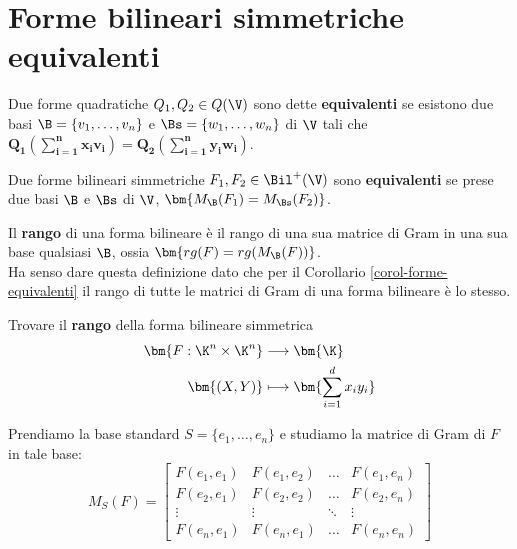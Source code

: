 \documentclass[11pt, a4paper, titlepage, oneside]{scrbook}
\begin{document}
\section{Forme bilineari simmetriche equivalenti}

\begin{Definizione}
\label{def-forme-quadratiche-equivalenti}
Due forme quadratiche $Q_1, Q_2 \in Q(\V)$ sono dette \textbf{equivalenti} se esistono due basi $\B = \{v_1, \ldots, v_n\}$ e $\Bs = \{w_1, \ldots, w_n\}$ di $\V$ tali che \mbox{$\bm{Q_1(\sum_{i = 1}^n x_i v_i) = Q_2(\sum_{i = 1}^n y_i w_i)}$}. 
\end{Definizione}

\begin{Definizione}
\label{def-forme-bilineari-simmmetriche-equivalenti}
Due forme bilineari simmetriche $F_1, F_2 \in \Bil^+(\V)$ sono \textbf{equivalenti} se prese due basi $\B$ e $\Bs$ di $\V$, \mbox{$\bm{M_\B(F_1) = M_\Bs(F_2)}$}.
\end{Definizione}

\begin{Definizione}
\label{def-rango-forma-bilienare}
Il \textbf{rango} di una forma bilineare è il rango di una sua matrice di Gram in una sua base qualsiasi $\B$, ossia $\bm{rg(F) = rg(M_\B(F))}$. \\
Ha senso dare questa definizione dato che per il Corollario \ref{corol-forme-equivalenti} il rango di tutte le matrici di Gram di una forma bilineare è lo stesso.
\end{Definizione}

\Esempio \nopagebreak

Trovare il \textbf{rango} della forma bilineare simmetrica \nopagebreak
\begin{align*}
\bm{F: \K^n \times \K^n} &\longrightarrow \bm{\K}  \\
\bm{(X,Y)} &\longmapsto \bm{\sum_{i = 1}^d x_i y_i} 
\end{align*}

Prendiamo la base standard $S = \{e_1, \ldots, e_n\}$ e studiamo la matrice di Gram di $F$ in tale base:
\[
M_S(F) = \begin{bmatrix}
    F(e_1,e_1) & F(e_1, e_2) & \dots & F(e_1, e_n) \\
    F(e_2, e_1) & F(e_2, e_2) & \dots & F(e_2, e_n) \\
    \vdots & \vdots & \ddots & \vdots \\
    F(e_n, e_1) & F(e_n, e_1) & \dots & F(e_n, e_n)
\end{bmatrix}
\]
\end{document}
